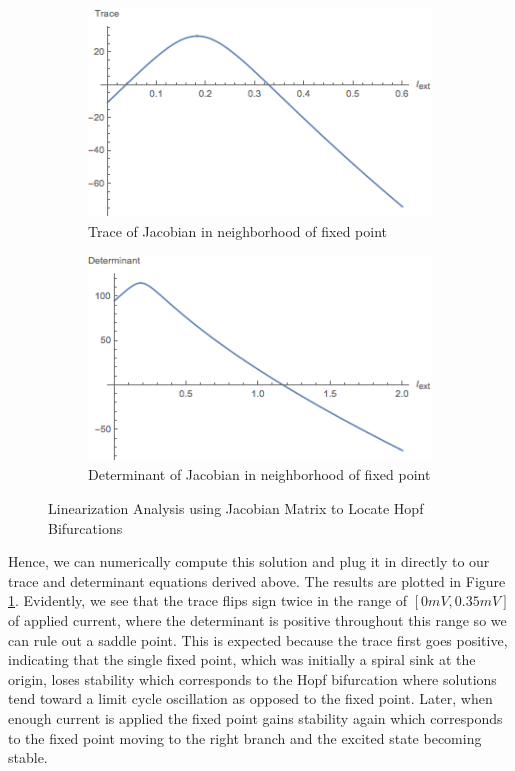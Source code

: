 \documentclass{article}
\begin{document}
\begin{figure}
\centering
\begin{subfigure}{\textwidth}
	\centering
	\includegraphics[width=10cm]{tr_ext.png}
	\caption{Trace of Jacobian in neighborhood of fixed point}
\end{subfigure}
\begin{subfigure}{\textwidth}
	\centering
	\includegraphics[width=10cm]{det_ext.png}
	\caption{Determinant of Jacobian in neighborhood of fixed point}
\end{subfigure}
	\caption{Linearization Analysis using Jacobian Matrix to Locate Hopf Bifurcations}
	\label{fig:det_tr}
\end{figure}

Hence, we can numerically compute this solution and plug it in directly to our trace and determinant equations derived above. The results are plotted in Figure \ref{fig:det_tr}. Evidently, we see that the trace flips sign twice in the range of $[0 mV,0.35 mV]$ of applied current, where the determinant is positive throughout this range so we can rule out a saddle point. This is expected because the trace first goes positive, indicating that the single fixed point, which was initially a spiral sink at the origin, loses stability which corresponds to the Hopf bifurcation where solutions tend toward a limit cycle oscillation as opposed to the fixed point. Later, when enough current is applied the fixed point gains stability again which corresponds to the fixed point moving to the right branch and the excited state becoming stable.
\end{document}
